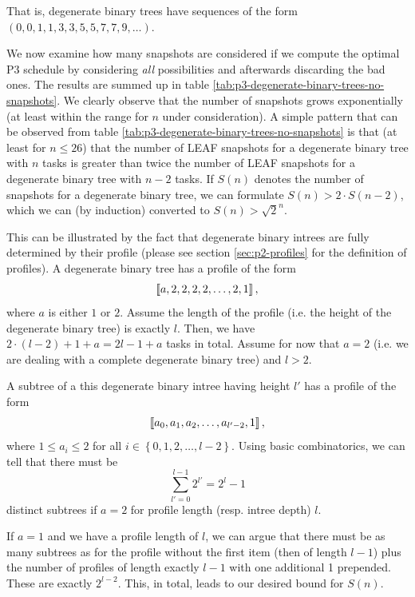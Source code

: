 That is, degenerate binary trees have sequences of the form $(0,0,1,1,3,3,5,5,7,7,9,\dots)$.

We now examine how many snapshots are considered if we compute the optimal P3 schedule by considering \emph{all} possibilities and afterwards discarding the bad ones. The results are summed up in table \ref{tab:p3-degenerate-binary-trees-no-snapshots}. We clearly observe that the number of snapshots grows exponentially (at least within the range for $n$ under consideration). A simple pattern that can be observed from table \ref{tab:p3-degenerate-binary-trees-no-snapshots} is that (at least for $n\leq 26$) that the number of LEAF snapshots for a degenerate binary tree with $n$ tasks is greater than twice the number of LEAF snapshots for a degenerate binary tree with $n-2$ tasks. If $S(n)$ denotes the number of snapshots for a degenerate binary tree, we can formulate $S(n)>2\cdot S(n-2)$, which we can (by induction) converted to $S(n) > \sqrt 2 ^ n$.

This can be illustrated by the fact that degenerate binary intrees are fully determined by their profile (please see section \ref{sec:p2-profiles} for the definition of profiles). A degenerate binary tree has a profile of the form
\begin{equation*}
  \left\llbracket a,2,2,2,2,\dots,2,1 \right\rrbracket,
\end{equation*}
where $a$ is either $1$ or $2$. Assume the length of the profile (i.e. the height of the degenerate binary tree) is exactly $l$. Then, we have $2\cdot(l-2)+1+a = 2l-1+a$ tasks in total. Assume for now that $a=2$ (i.e. we are dealing with a complete degenerate binary tree) and $l>2$.

A subtree of a this degenerate binary intree having height $l'$ has a profile of the form
\begin{equation*}
  \left\llbracket a_0,a_1,a_2,\dots,a_{l'-2},1 \right\rrbracket,
\end{equation*}
where $1\leq a_i \leq 2$ for all $i\in\left\{ 0,1,2,\dots,l-2 \right\}$. Using basic combinatorics, we can tell that there must be
\begin{equation*}
  \sum_{l'=0}^{l-1} 2^{l'} = 2^{l} -1
\end{equation*}
distinct subtrees if $a=2$ for profile length (resp. intree depth) $l$.

If $a=1$ and we have a profile length of $l$, we can argue that there must be as many subtrees as for the profile without the first item (then of length $l-1$) plus the number of profiles of length exactly $l-1$ with one additional 1 prepended. These are exactly $2^{l-2}$. This, in total, leads to our desired bound for $S(n)$.

